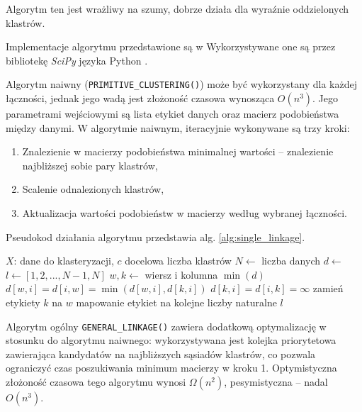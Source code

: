 \documentclass[a4paper,twoside,12pt]{book}
\newcommand{\obcy}[1]{\emph{#1}}
\newcommand{\english}[1]{{\selectlanguage{british}\obcy{#1}}}
\newcommand{\procedura}[1]{\textsc{#1}}
\newcommand{\SingleLinkage}{\procedura{SingleLinkage}}
\begin{document}
Algorytm ten jest wrażliwy na szumy, dobrze działa dla wyraźnie oddzielonych klastrów.

Implementacje algorytmu przedstawione są w \cite{bib:hierarchical-algorithms} Wykorzystywane one są przez bibliotekę \english{SciPy} języka Python \cite{bib:scipy-linkage}.

Algorytm naiwny (\texttt{PRIMITIVE\_CLUSTERING()}) może być wykorzystany dla każdej łączności, jednak jego wadą jest złożoność czasowa wynosząca $O(n^{3})$.
Jego parametrami wejściowymi są lista etykiet danych oraz macierz podobieństwa między danymi. W algorytmie naiwnym, iteracyjnie wykonywane są trzy kroki:
\begin{enumerate}
	\item Znalezienie w macierzy podobieństwa minimalnej wartości -- znalezienie najbliższej sobie pary klastrów,
	\item Scalenie odnalezionych klastrów,
	\item Aktualizacja wartości podobieństw w macierzy według wybranej łączności.
\end{enumerate}
Pseudokod działania algorytmu przedstawia alg. \ref{alg:single_linkage}.

\begin{algorithm}[t]
	\caption{Algorytm aglomeracyjnego grupowania hierarchicznego \SingleLinkage{}}
	\label{alg:single_linkage}
	\begin{algorithmic}[1]
		\Require $X$: dane do klasteryzacji, $c$ docelowa liczba klastrów
		\State $N \gets $ liczba danych
		\State $d \gets $  
		\State $l \gets [1, 2, ..., N-1, N]$ 
		\State $w, k \gets $ wiersz i kolumna $\min(d)$  
		\State $d[w, i] = d[i, w] = \min(d[w, i], d[k, i]) $ 
		\State $d[k, i] = d[i, k] = \infty $ 
		\EndFor
		\State zamień etykiety $k$ na $w$
		\EndFor
		\State mapowanie etykiet na kolejne liczby naturalne
		\State \Return $l$
		\EndProcedure
	\end{algorithmic}
\end{algorithm}

Algorytm ogólny \texttt{GENERAL\_LINKAGE()} zawiera dodatkową optymalizację w stosunku do algorytmu naiwnego: wykorzystywana jest kolejka priorytetowa zawierająca kandydatów na najbliższych sąsiadów klastrów, co pozwala ograniczyć czas poszukiwania minimum macierzy w kroku 1. Optymistyczna złożoność czasowa tego algorytmu wynosi $\Omega(n^{2})$, pesymistyczna -- nadal $O(n^{3})$.
\end{document}
